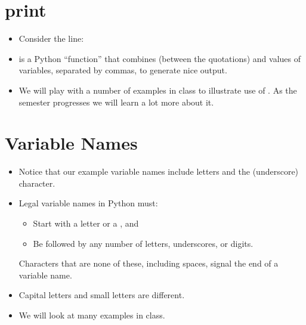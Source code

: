 \documentclass[letterpaper,10pt,english]{sphinxmanual}
\begin{document}
\section{print}
\label{\detokenize{lecture_notes/lec02_calculator:print}}\begin{itemize}
\item {} 
Consider the line:

\begin{sphinxVerbatim}[commandchars=\\\{\}]
   
\end{sphinxVerbatim}

\item {} 
is a Python “function” that combines  (between the
quotations) and values of variables, separated by commas, to
generate nice output.

\item {} 
We will play with a number of examples in class to illustrate use
of .  As the semester progresses we will learn a lot more
about it.

\end{itemize}


\section{Variable Names}
\label{\detokenize{lecture_notes/lec02_calculator:variable-names}}\begin{itemize}
\item {} 
Notice that our example variable names include letters and the \sphinxcode{\sphinxupquote{\_}}
(underscore) character.

\item {} 
Legal variable names in Python must:
\begin{itemize}
\item {} 
Start with a letter or a \sphinxcode{\sphinxupquote{\_}}, and

\item {} 
Be followed by any number of letters, underscores, or digits.

\end{itemize}

Characters that are none of these, including spaces, signal the end
of a variable name.

\item {} 
Capital letters and small letters are different.

\item {} 
We will look at many examples in class.

\end{itemize}
\end{document}
